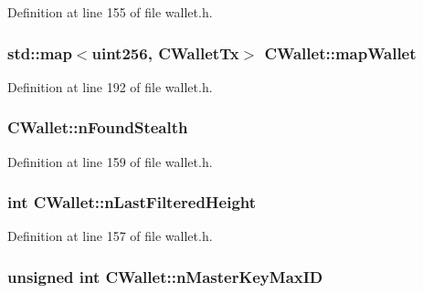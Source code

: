 Definition at line 155 of file wallet.\+h.

\hypertarget{class_c_wallet_a0b17f72f2170090f2de43a6c48af3214}{}
\subsubsection[{map\+Wallet}]{\setlength{\rightskip}{0pt plus 5cm}std\+::map$<${\bf uint256}, {\bf C\+Wallet\+Tx}$>$ C\+Wallet\+::map\+Wallet}\label{class_c_wallet_a0b17f72f2170090f2de43a6c48af3214}


Definition at line 192 of file wallet.\+h.

\hypertarget{class_c_wallet_a8bf6ef405ab6ad3c38a895df54c365d9}{}
\subsubsection[{n\+Found\+Stealth}]{ C\+Wallet\+::n\+Found\+Stealth}\label{class_c_wallet_a8bf6ef405ab6ad3c38a895df54c365d9}


Definition at line 159 of file wallet.\+h.

\hypertarget{class_c_wallet_a5a2454436e420bece1c747a3b0b09a87}{}
\subsubsection[{n\+Last\+Filtered\+Height}]{\setlength{\rightskip}{0pt plus 5cm}int C\+Wallet\+::n\+Last\+Filtered\+Height}\label{class_c_wallet_a5a2454436e420bece1c747a3b0b09a87}


Definition at line 157 of file wallet.\+h.

\hypertarget{class_c_wallet_aecfc6e4a6ea958ec369ca77d790271e3}{}
\subsubsection[{n\+Master\+Key\+Max\+I\+D}]{\setlength{\rightskip}{0pt plus 5cm}unsigned int C\+Wallet\+::n\+Master\+Key\+Max\+I\+D}\label{class_c_wallet_aecfc6e4a6ea958ec369ca77d790271e3}


